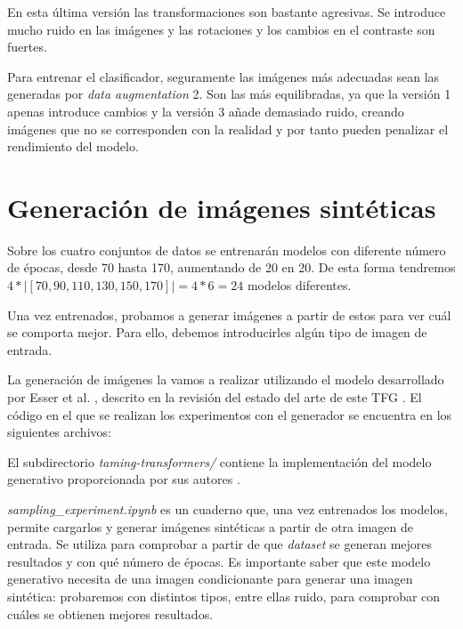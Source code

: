 En esta última versión las transformaciones son bastante agresivas. Se introduce mucho ruido en las imágenes y las rotaciones y los cambios en el contraste son fuertes.

Para entrenar el clasificador, seguramente las imágenes más adecuadas sean las generadas por \textit{data augmentation} 2. Son las más equilibradas, ya que la versión 1 apenas introduce cambios y la versión 3 añade demasiado ruido, creando imágenes que no se corresponden con la realidad y por tanto pueden penalizar el rendimiento del modelo.

\newpage
\section{Generación de imágenes sintéticas}

Sobre los cuatro conjuntos de datos se entrenarán modelos con diferente número de épocas, desde 70 hasta 170, aumentando de 20 en 20. De esta forma tendremos $4 * |[70, 90, 110, 130, 150, 170]| = 4 * 6 = 24$ modelos diferentes.

Una vez entrenados, probamos a generar imágenes a partir de estos para ver cuál se comporta mejor. Para ello, debemos introducirles algún tipo de imagen de entrada.

La generación de imágenes la vamos a realizar utilizando el modelo desarrollado por Esser et al. \cite{esser2021taming}, descrito en la revisión del estado del arte de este TFG \label{st:taming-transformers}. El código en el que se realizan los experimentos con el generador se encuentra en los siguientes archivos:

\vspace{0.2cm}

\noindent El subdirectorio \textit{taming-transformers/} contiene la implementación del modelo generativo proporcionada por sus autores \cite{taming-transformers-github}. 

\noindent \textit{sampling\_experiment.ipynb} es un cuaderno que, una vez entrenados los modelos, permite cargarlos y generar imágenes sintéticas a partir de otra imagen de entrada. Se utiliza para comprobar a partir de que \textit{dataset} se generan mejores resultados y con qué número de épocas. Es importante saber que este modelo generativo necesita de una imagen condicionante para generar una imagen sintética: probaremos con distintos tipos, entre ellas ruido, para comprobar con cuáles se obtienen mejores resultados.


